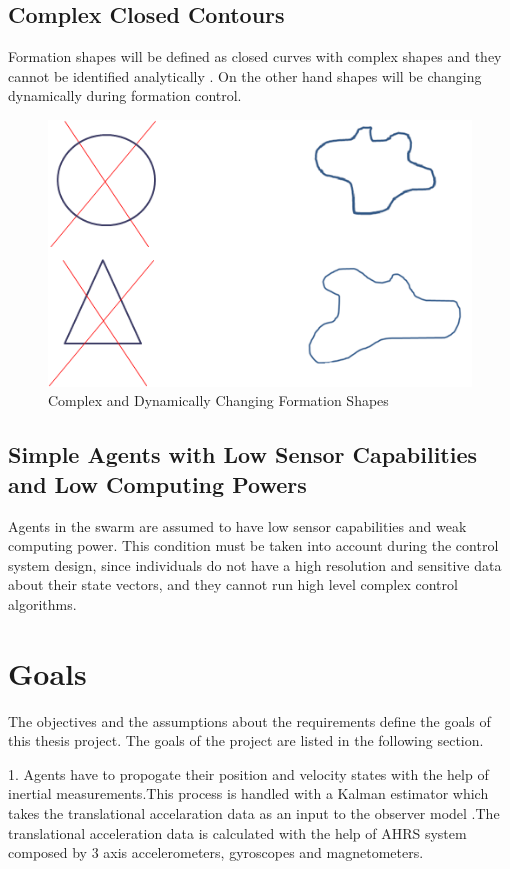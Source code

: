 \subsection{Complex Closed Contours}
Formation shapes will be defined as closed curves with complex shapes and they cannot be identified analytically . On the other hand shapes will be changing dynamically during formation control. 

\begin{figure}[H]
	\caption{Complex and Dynamically Changing Formation Shapes}
	\centering
	\includegraphics[scale = 1]{complex}
\end{figure} 



\subsection{Simple Agents with Low Sensor Capabilities and Low Computing Powers}


Agents in the swarm are assumed to have low sensor capabilities and weak computing power. This 
condition must be taken into account during the control system design, since individuals do not have a high resolution and sensitive data about their state vectors, and they cannot run high level complex control algorithms.


\section{Goals}

The objectives and the assumptions about the requirements define the goals of this thesis project. The goals of the project are listed in the following section.

1. Agents have to propogate their position and velocity states with the help of inertial measurements.This process is handled with a Kalman estimator which takes the translational accelaration data as an input to the observer model .The translational acceleration data is calculated with the help of AHRS system composed by 3 axis accelerometers, gyroscopes and magnetometers. 

